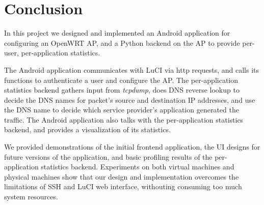 \section{Conclusion}

In this project we designed and implemented an Android application for configuring an OpenWRT AP, and a Python backend on the AP to provide per-user, per-application statistics.

The Android application communicates with LuCI via http requests, and calls its functions to authenticate a user and configure the AP. The per-application statistics backend gathers input from \textit{tcpdump}, does DNS reverse lookup to decide the DNS names for packet's source and destination IP addresses, and use the DNS name to decide which service provider's application generated the traffic. The Android application also talks with the per-application statistics backend, and provides a visualization of its statistics.

We provided demonstrations of the initial frontend application, the UI designs for future versions of the application, and basic profiling results of the per-application statistics backend. Experiments on both virtual machines and physical machines show that our design and implementation overcomes the limitations of SSH and LuCI web interface, withouting consuming too much system resources.